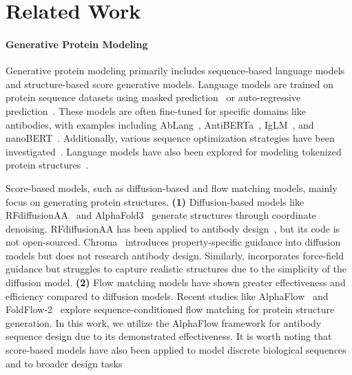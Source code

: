 \section{Related Work}
\label{appendix: related_work}



\paragraph{Generative Protein Modeling}
Generative protein modeling primarily includes sequence-based language models and structure-based score generative models. Language models are trained on protein sequence datasets using masked prediction~\cite{rives2019biological} or auto-regressive prediction~\cite{ferruz2022protgpt2}. These models are often fine-tuned for specific domains like antibodies, with examples including AbLang~\cite{Olsen2022}, AntiBERTa~\cite{leem2022deciphering}, IgLM~\cite{shuai2021generative}, and nanoBERT~\cite{hadsund2024nanobert}.
%
Additionally, various sequence optimization strategies have been investigated~\cite{chen2023bidirectional, chan2021deep}.
%
Language models have also been explored for modeling tokenized protein structures~\cite{hayes2024simulating, su2023saprot}.
%


Score-based models, such as diffusion-based and flow matching models, mainly focus on generating protein structures. \textbf{(1)} Diffusion-based models like RFdiffusionAA~\cite{krishna2024generalized} and AlphaFold3~\cite{abramson2024accurate} generate structures through coordinate denoising. RFdiffusionAA has been applied to antibody design~\cite{bennett2024atomically}, but its code is not open-sourced. Chroma~\cite{ingraham2023illuminating} introduces property-specific guidance into diffusion models but does not research antibody design. Similarly, \cite{kulyte2024improving} incorporates force-field guidance but struggles to capture realistic structures due to the simplicity of the diffusion model.
%
\textbf{(2)} Flow matching models have shown greater effectiveness and efficiency compared to diffusion models. Recent studies like AlphaFlow~\cite{jing2024alphafold} and FoldFlow-2~\cite{huguet2024sequence} explore sequence-conditioned flow matching for protein structure generation. In this work, we utilize the AlphaFlow framework for antibody sequence design due to its demonstrated effectiveness.
%
It is worth noting that score-based models have also been applied to model discrete biological sequences~\cite{campbell2024generative, frey2023protein, li2024full, ikram2024antibody} and to broader design tasks~\cite{krishnamoorthy2023diffusion, chen2024robust, yuan2024design}

